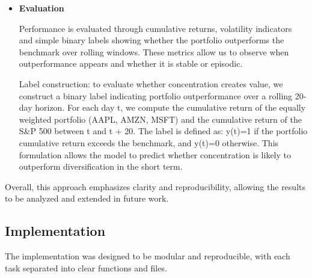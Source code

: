 \documentclass[11pt,a4paper]{article}
\begin{document}
\begin{itemize}
\item \textbf{Evaluation}

Performance is evaluated through cumulative returns, volatility indicators and simple binary labels showing whether the portfolio outperforms the benchmark over rolling windows. These metrics allow us to observe when outperformance appears and whether it is stable or episodic.

Label construction: to evaluate whether concentration creates value, we construct a binary label indicating portfolio outperformance over a rolling 20-day horizon. For each day t, we compute the cumulative return of the equally weighted portfolio (AAPL, AMZN, MSFT) and the cumulative return of the S&P 500 between t and t + 20. The label is defined as: y(t)=1 if the portfolio cumulative return exceeds the benchmark, and y(t)=0 otherwise. This formulation allows the model to predict whether concentration is likely to outperform diversification in the short term.

\end{itemize}

\noindent Overall, this approach emphasizes clarity and reproducibility, allowing the results to be analyzed and extended in future work.

\subsection{Implementation}

\noindent The implementation was designed to be modular and reproducible, with each task separated into clear functions and files.
\end{document}
